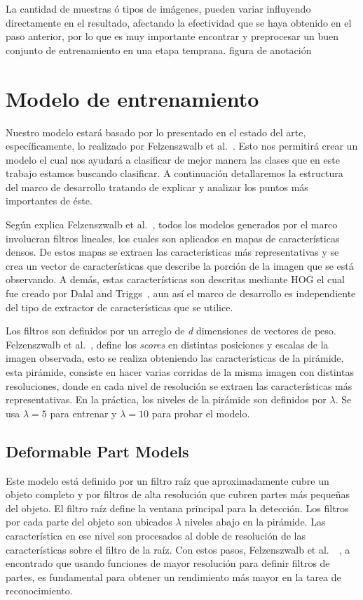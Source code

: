 La cantidad de muestras ó tipos de imágenes, pueden variar influyendo directamente en el resultado, afectando la efectividad que se haya obtenido en el paso anterior, por lo que es muy importante encontrar y preprocesar un buen conjunto de entrenamiento en una etapa temprana.
figura de anotación
\section{Modelo de entrenamiento}
\label{sec:model}
Nuestro modelo estará basado por lo presentado en el estado del arte, específicamente, lo realizado por Felzenszwalb et al.~\cite{Felzenszwalb2010}. Esto nos permitirá crear un modelo el cual nos ayudará a clasificar de mejor manera las clases que en este trabajo estamos buscando clasificar. A continuación detallaremos la estructura del marco de desarrollo tratando de explicar y analizar los puntos más importantes de éste.

Según explica Felzenszwalb et al.~\cite{Felzenszwalb2010}, todos los modelos generados por el marco involucran filtros lineales, los cuales son aplicados en mapas de características densos. De estos mapas se extraen las características más representativas y se crea un vector de características que describe la porción de la imagen que se está observando. A demás, estas características son descritas mediante HOG el cual fue creado por Dalal and Triggs~\cite{Dalal2005}, aun así el marco de desarrollo es independiente del tipo de extractor de características que se utilice.

Los filtros son definidos por un arreglo de \textit{d} dimensiones de vectores de peso. Felzenszwalb et al.~\cite{Felzenszwalb2010}, define los \textit{scores} en distintas posiciones y escalas de la imagen observada, esto se realiza obteniendo las características de la pirámide, esta pirámide, consiste en hacer varias corridas de la misma imagen con distintas resoluciones, donde en cada nivel de resolución se extraen las características más representativas. En la práctica, los niveles de la pirámide son definidos por $\lambda$. Se usa $\lambda = 5$ para entrenar y $\lambda = 10$ para probar el modelo.

\subsection{Deformable Part Models}
\label{subsec:dpm}
Este modelo está definido por un filtro raíz que aproximadamente cubre un objeto completo y por filtros de alta resolución que cubren partes más pequeñas del objeto. El filtro raíz define la ventana principal para la detección. Los filtros por cada parte del objeto son ubicados $\lambda$ niveles abajo en la pirámide. Las característica en ese nivel son procesados al doble de resolución de las características sobre el filtro de la raíz.
Con estos pasos, Felzenszwalb et al.~\cite{Felzenszwalb2010}~\cite{Felzenszwalb2013}, a encontrado que usando funciones de mayor resolución para definir filtros de partes, es fundamental para obtener un rendimiento más mayor en la tarea de reconocimiento.

